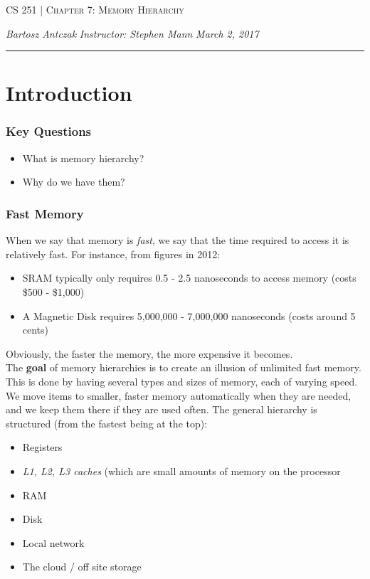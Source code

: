 \documentclass{report}
\newcommand{\lectureNum}{7}
\newcommand{\curDate}{March 2, 2017}
\newcommand{\course}{CS 251}
\newcommand{\instructor}{Stephen Mann}
\begin{document}
\begin{center}
\begin{Large}
\textsc{\course{} | Chapter \lectureNum{}: Memory Hierarchy}
\end{Large}
\end{center} 
\noindent \textit{Bartosz Antczak} \hfill
\textit{Instructor: \instructor{}} \hfill
\textit{\curDate{}}
\rule{\textwidth}{0.4pt}
\section{Introduction}
\subsubsection{Key Questions}
\begin{itemize}
\item What is memory hierarchy?
\item Why do we have them?
\end{itemize}
\subsubsection{Fast Memory}
When we say that memory is \textit{fast}, we say that the time required to access it is relatively fast. For instance, from figures in 2012:
\begin{itemize}
\item SRAM typically only requires 0.5 - 2.5 nanoseconds to access memory (costs \$500 - \$1,000)
\item A Magnetic Disk requires 5,000,000 - 7,000,000 nanoseconds (costs around 5 cents)
\end{itemize}
Obviously, the faster the memory, the more expensive it becomes.\\
The \textbf{goal} of memory hierarchies is to create an illusion of unlimited fast memory. This is done by having several types and sizes of memory, each of varying speed. We move items to smaller, faster memory automatically when they are needed, and we keep them there if they are used often.
The general hierarchy is structured (from the fastest being at the top):
\begin{itemize}
\item Registers
\item \textit{L1, L2, L3 caches} (which are small amounts of memory on the processor
\item RAM
\item Disk
\item Local network
\item The cloud / off site storage
\end{itemize}
\end{document}
